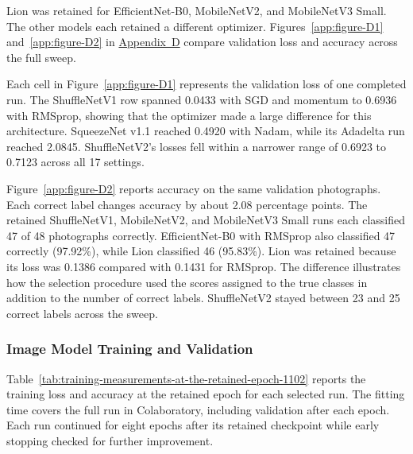 \begin{thesisprose}
Lion was retained for EfficientNet-B0, MobileNetV2, and MobileNetV3 Small. The other models each retained a different optimizer. Figures~\ref{app:figure-D1} and~\ref{app:figure-D2} in \hyperref[app:section-D]{Appendix~D} compare validation loss and accuracy across the full sweep.

Each cell in Figure~\ref{app:figure-D1} represents the validation loss of one completed run. The ShuffleNetV1 row spanned 0.0433 with SGD and momentum to 0.6936 with RMSprop, showing that the optimizer made a large difference for this architecture. SqueezeNet v1.1 reached 0.4920 with Nadam, while its Adadelta run reached 2.0845. ShuffleNetV2’s losses fell within a narrower range of 0.6923 to 0.7123 across all 17 settings.

Figure~\ref{app:figure-D2} reports accuracy on the same validation photographs. Each correct label changes accuracy by about 2.08 percentage points. The retained ShuffleNetV1, MobileNetV2, and MobileNetV3 Small runs each classified 47 of 48 photographs correctly. EfficientNet-B0 with RMSprop also classified 47 correctly (97.92\%), while Lion classified 46 (95.83\%). Lion was retained because its loss was 0.1386 compared with 0.1431 for RMSprop. The difference illustrates how the selection procedure used the scores assigned to the true classes in addition to the number of correct labels. ShuffleNetV2 stayed between 23 and 25 correct labels across the sweep.

\subsubsection{Image Model Training and Validation}

Table~\ref{tab:training-measurements-at-the-retained-epoch-1102} reports the training loss and accuracy at the retained epoch for each selected run. The fitting time covers the full run in Colaboratory, including validation after each epoch. Each run continued for eight epochs after its retained checkpoint while early stopping checked for further improvement.


\end{thesisprose}
